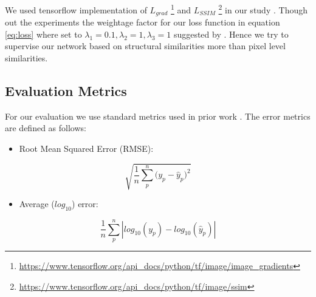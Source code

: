 

We used tensorflow implementation of \(L_{grad}\) \footnote{\url{https://www.tensorflow.org/api_docs/python/tf/image/image_gradients}} and \(L_{SSIM}\) \footnote{\url{https://www.tensorflow.org/api_docs/python/tf/image/ssim}}  in our study \cite{tensorflow2015-whitepaper}. Though out the experiments the weightage factor for our loss function in equation \ref{eq:loss} where set to  \(\lambda_{1} = 0.1, \lambda_{2} = 1, \lambda_{3} = 1\) suggested by \cite{Alhashim2018}. Hence we try to supervise our network based on structural similarities more than pixel level similarities. 


\newpage


\subsection{Evaluation Metrics}
\label{Chapter5:Evaluation_mat}
For our evaluation we use standard metrics used in prior work \cite{Alhashim2018, eigen2014depth}. The error metrics are defined as follows:
\begin{itemize}
    
    \item Root Mean Squared Error (RMSE):
    
\end{itemize}{}

\begin{equation} \label{RMSE}
        \sqrt{\frac{1}{n} \sum_{p}^{n}{(y_{p} - \hat{y}_{p}})^2}
\end{equation}

\begin{itemize}

    \item Average (${log_{10}}$) error: 
    
\end{itemize}{}

\begin{equation} \label{avg_log}
    \frac{1}{n} \sum_{p}^{n} \left|log_{10}(y_{p}) - log_{10}(\hat{y}_{p}) \right|
\end{equation}


